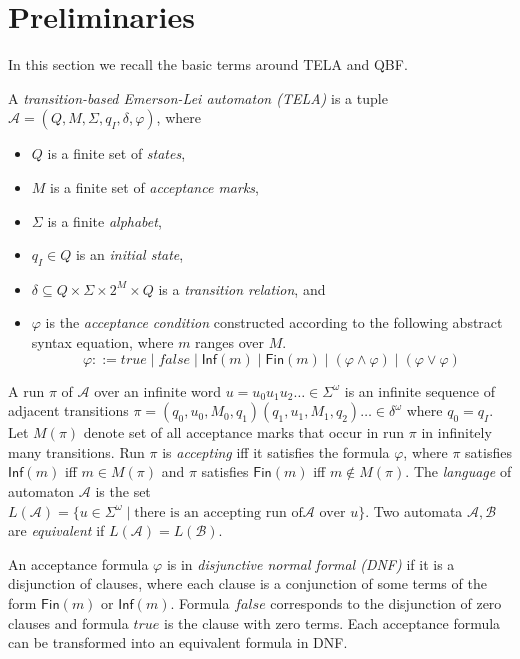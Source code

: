 \documentclass[a4paper,UKenglish,cleveref, autoref, thm-restate]{lipics-v2021}
\def\Inf{\ensuremath{\mathsf{Inf}}}
\def\Fin{\ensuremath{\mathsf{Fin}}}
\def\false{\mathit{false}}
\def\true{\mathit{true}}
\newcommand{\mA}{\mathcal{A}}
\newcommand{\mB}{\mathcal{B}}
\begin{document}

\section{Preliminaries}\label{sec:prelim}

In this section we recall the basic terms around TELA and QBF.

\begin{definition}[TELA]
  A \emph{transition-based Emerson-Lei automaton (TELA)} is a tuple
  $\mA =(Q,M,\Sigma,q_I,\delta,\varphi)$, where
  \begin{itemize}
  \item $Q$ is a finite set of \emph{states},
  \item $M$ is a finite set of \emph{acceptance marks},
  \item $\Sigma$ is a finite \emph{alphabet},
  \item $q_I\in Q$ is an \emph{initial state},
  \item $\delta \subseteq Q \times \Sigma \times 2^{M} \times Q$ is a
    \emph{transition relation}, and
  \item $\varphi$ is the \emph{acceptance condition} constructed
    according to the following abstract syntax equation, where $m$
    ranges over $M$.
    $$\varphi ::= \true \mid \false \mid \Inf(m) \mid \Fin(m) \mid \left( \varphi \land \varphi \right) \mid \left( \varphi \lor \varphi \right)$$
\end{itemize}
\end{definition}

A run $\pi$ of $\mA$ over an infinite word
$u = u_{0}u_{1}u_{2}\dots \in \Sigma^{\omega}$ is an infinite sequence
of adjacent transitions
$\pi=(q_0,u_0,M_0,q_1)(q_1,u_1,M_1,q_2)\dots\in\delta^{\omega}$ where
$q_0=q_I$. Let $M(\pi)$ denote set of all acceptance marks that occur
in run $\pi$ in infinitely many transitions. Run $\pi$ is
\emph{accepting} iff it satisfies the formula $\varphi$, where $\pi$
satisfies $\Inf(m)$ iff $m\in M(\pi)$ and $\pi$ satisfies $\Fin(m)$
iff $m\not\in M(\pi)$. The \emph{language} of automaton $\mA$ is the
set
$L(\mA)=\{u\in \Sigma^{\omega}\mid\textrm{there is an accepting run of
}\mA\textrm{ over }u\}$. Two automata $\mA,\mB$ are \emph{equivalent}
if $L(\mA)=L(\mB)$.

An acceptance formula $\varphi$ is in \emph{disjunctive normal formal
  (DNF)} if it is a disjunction of clauses, where each clause is a
conjunction of some terms of the form $\Fin(m)$ or $\Inf(m)$.  Formula
$\false$ corresponds to the disjunction of zero clauses and formula
$\true$ is the clause with zero terms. Each acceptance formula can be
transformed into an equivalent formula in DNF.
\end{document}
